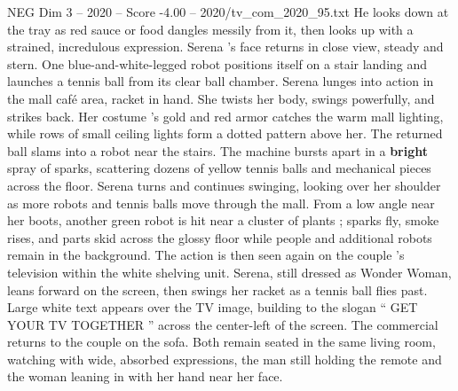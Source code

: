 \begin{textsample}{NEG Dim 3 – 2020 – Score -4.00 – 2020/tv\_com\_2020\_95.txt}
He looks down at the tray as red sauce or food dangles messily from it, then looks up with a strained, incredulous expression.
Serena ’s face returns in close view, steady and stern.
One blue-and-white-legged robot positions itself on a stair landing and launches a tennis ball from its clear ball chamber.
Serena lunges into action in the mall café area, racket in hand.
She twists her body, swings powerfully, and strikes back.
Her costume ’s gold and red armor catches the warm mall lighting, while rows of small ceiling lights form a dotted pattern above her.
The returned ball slams into a robot near the stairs.
The machine bursts apart in a \textbf{bright} spray of sparks, scattering dozens of yellow tennis balls and mechanical pieces across the floor.
Serena turns and continues swinging, looking over her shoulder as more robots and tennis balls move through the mall.
From a low angle near her boots, another green robot is hit near a cluster of plants ; sparks fly, smoke rises, and parts skid across the glossy floor while people and additional robots remain in the background.
The action is then seen again on the couple ’s television within the white shelving unit.
Serena, still dressed as Wonder Woman, leans forward on the screen, then swings her racket as a tennis ball flies past.
Large white text appears over the TV image, building to the slogan “ GET YOUR TV TOGETHER ” across the center-left of the screen.
The commercial returns to the couple on the sofa.
Both remain seated in the same living room, watching with wide, absorbed expressions, the man still holding the remote and the woman leaning in with her hand near her face.

\end{textsample}
